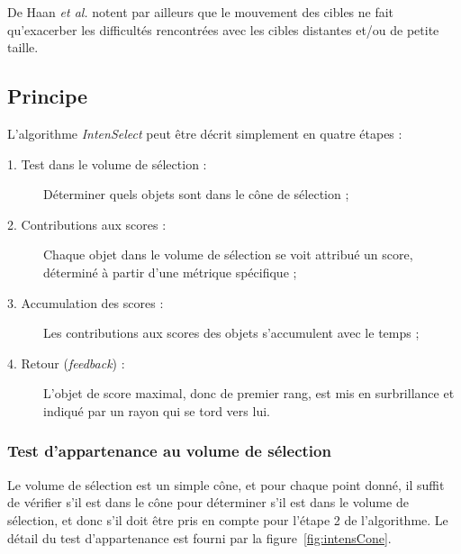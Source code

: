 	De Haan \emph{et al.} notent par ailleurs que le mouvement des cibles ne fait qu'exacerber les difficultés rencontrées avec les cibles distantes et/ou de petite taille.
	
	\subsection{Principe}
	L'algorithme \emph{IntenSelect} peut être décrit simplement en quatre étapes :
	
	\begin{description}
		\item[1. Test dans le volume de sélection :] Déterminer quels objets sont dans le cône de sélection ;
		\item[2. Contributions aux scores :] Chaque objet dans le volume de sélection se voit attribué un score, déterminé à partir d'une métrique spécifique ;
		\item[3. Accumulation des scores :] Les contributions aux scores des objets s'accumulent avec le temps ;
		\item[4. Retour (\emph{feedback}) :] L'objet de score maximal, donc de premier rang, est mis en surbrillance et indiqué par un rayon qui se \og tord \fg{} vers lui.
	\end{description}
	
	\subsubsection{Test d'appartenance au volume de sélection}
	Le volume de sélection est un simple cône, et pour chaque point donné, il suffit de vérifier s'il est dans le cône pour déterminer s'il est dans le volume de sélection, et donc s'il doit être pris en compte pour l'étape 2 de l'algorithme. Le détail du test d'appartenance est fourni par la figure~\ref{fig:intensCone}.
	
